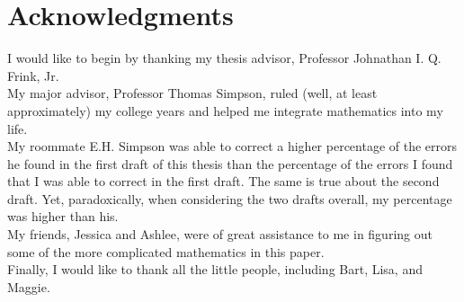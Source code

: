 \chapter*{Acknowledgments}

I would like to begin by thanking my thesis advisor, 
Professor Johnathan I. Q. Frink, Jr.\\

My major advisor, Professor Thomas Simpson, ruled
(well, at least approximately) my college years 
and helped me integrate mathematics into my life.\\

My roommate E.H. Simpson was able to correct a higher
percentage of the errors he found in the first draft
of this thesis than the percentage of the errors I
found that I was able to correct in the first draft.
The same is true about the second draft. Yet, 
paradoxically, when considering the two drafts overall,
my percentage was higher than his.\\

My friends, Jessica and Ashlee, were of great 
assistance to me in figuring out some of the more
complicated mathematics in this paper.\\

Finally, I would like to thank all the little people,
including Bart, Lisa, and Maggie.
